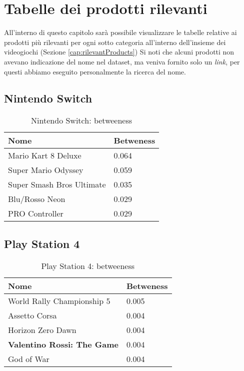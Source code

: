 \chapter{Tabelle dei prodotti rilevanti}		
\label{cap:Tabelle}
	All'interno di questo capitolo sarà possibile visualizzare le tabelle relative ai prodotti più rilevanti per ogni sotto categoria all'interno dell'insieme dei videogiochi (Sezione \ref{cap:rilevantProducts}) Si noti che alcuni prodotti non avevano indicazione del nome nel dataset, ma veniva fornito solo un \textit{link}, per questi abbiamo eseguito personalmente la ricerca del nome.
	
	\section{Nintendo Switch}
		\begin{table}[H]
			\caption{Nintendo Switch: betweeness}
			\label{tab:nintendoswitch}
			\centering
			\begin{tabular}{ll}
				\toprule 
				\textbf{Nome} & \textbf{Betweness} \\
				\midrule
				Mario Kart 8 Deluxe  & 0.064 \\
				Super Mario Odyssey  & 0.059 \\
				Super Smash Bros Ultimate  & 0.035 \\
				Blu/Rosso Neon  & 0.029 \\
				PRO Controller  & 0.029 \\		
				\bottomrule
			\end{tabular}
		\end{table}
	
	\section{Play Station 4}
		\begin{table}[H]
			\caption{Play Station 4: betweeness}
			\label{tab:ps4}
			\centering
			\begin{tabular}{ll}
				\toprule
				\textbf{Nome} & \textbf{Betweness} \\
				\midrule
				World Rally Championship 5  & 0.005 \\
				Assetto Corsa  & 0.004 \\
				Horizon Zero Dawn  & 0.004 \\
				\textbf{Valentino Rossi: The Game}  & 0.004 \\
				God of War  & 0.004 \\		
				\bottomrule
			\end{tabular}
		\end{table}
	
